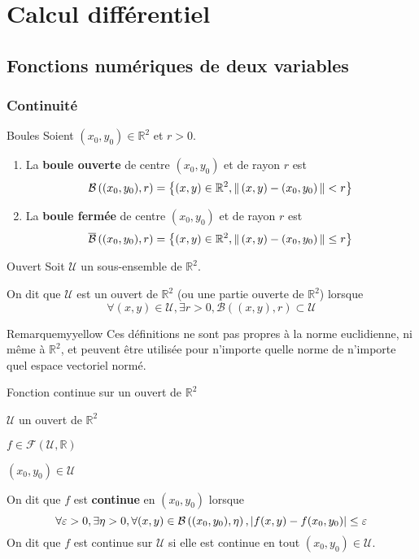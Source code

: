 \section{Calcul différentiel}

\subsection{Fonctions numériques de deux variables}

    \subsubsection{Continuité}

    \begin{defi}{Boules}{}
        Soient $(x_0,y_0) \in \mathbb{R}^2$ et $r > 0$.
        \begin{enumerate}
            \item La \textbf{boule ouverte} de centre $(x_0,y_0)$ et de rayon $r$ est 
            \[ \mathcal{B}\left((x_0,y_0),r\right) = \left\{ (x,y) \in \mathbb{R}^2, \left\lVert\,(x,y) - (x_0,y_0)\,\right\rVert < r \right\} \]
            \item La \textbf{boule fermée} de centre $(x_0,y_0)$ et de rayon $r$ est 
            \[ \overline{\mathcal{B}}\left((x_0,y_0),r\right) = \left\{ (x,y) \in \mathbb{R}^2, \left\lVert\,(x,y) - (x_0,y_0)\,\right\rVert \leq r \right\} \]
        \end{enumerate}
    \end{defi}

    \begin{defi}{Ouvert}{}
        Soit $\mathcal{U}$ un sous-ensemble de $\mathbb{R}^2$.

        On dit que $\mathcal{U}$ est un ouvert de $\mathbb{R}^2$ (ou une partie ouverte de $\mathbb{R}^2$) lorsque 
        \[ \forall (x,y) \in \mathcal{U}, \exists r > 0, \mathcal{B}\left((x,y),r\right) \subset \mathcal{U} \]
    \end{defi}

    \begin{omed}{Remarque}{myyellow}
        Ces définitions ne sont pas propres à la norme euclidienne, ni même à $\mathbb{R}^2$, et peuvent être utilisée pour n’importe quelle norme de n’importe quel espace vectoriel normé.
    \end{omed}

    \begin{defi}{Fonction continue sur un ouvert de $\mathbb{R}^2$}{}
        \begin{soient}
            \item $\mathcal{U}$ un ouvert de $\mathbb{R}^2$
            \item $f \in \mathcal{F}(\mathcal{U},\mathbb{R})$
            \item $(x_0,y_0) \in \mathcal{U}$
        \end{soient}
        On dit que $f$ est \textbf{continue} en $(x_0,y_0)$ lorsque 
        \[ \forall \varepsilon > 0,  \exists \eta > 0,  \forall(x,y) \in \mathcal{B}\left((x_0,y_0),\eta\right),  \left\lvert f(x,y)-f(x_0,y_0)\right\rvert \leq \varepsilon \]
        On dit que $f$ est continue sur $\mathcal{U}$ si elle est continue en tout $(x_0,y_0) \in \mathcal{U}$.
    \end{defi}

